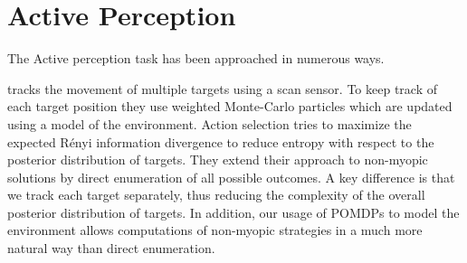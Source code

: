 \section{Active Perception}

The Active perception task has been approached in numerous ways.

%

%

%

\citet{cit:relworktanks} tracks the movement of multiple targets using a scan sensor. To keep track
of each target position they use weighted Monte-Carlo particles which are updated using a model of
the environment. Action selection tries to maximize the expected Rényi information divergence to
reduce entropy with respect to the posterior distribution of targets. They extend their approach to
non-myopic solutions by direct enumeration of all possible outcomes. A key difference is that we
track each target separately, thus reducing the complexity of the overall posterior distribution of
targets. In addition, our usage of POMDPs to model the environment allows computations of non-myopic
strategies in a much more natural way than direct enumeration. 

